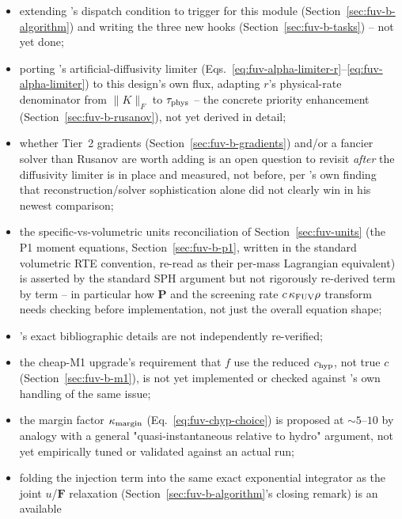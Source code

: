 \begin{itemize}
  \item extending 's dispatch condition to
    trigger for this module (Section~\ref{sec:fuv-b-algorithm}) and
    writing the three new  hooks
    (Section~\ref{sec:fuv-b-tasks}) -- not yet done;
  \item porting \citet{Hopkins2017diffusion}'s artificial-diffusivity
    limiter (Eqs.~\ref{eq:fuv-alpha-limiter-r}--\ref{eq:fuv-alpha-limiter})
    to this design's own flux, adapting $r$'s physical-rate denominator
    from $\|K\|_F$ to $\tau_{\rm phys}$ -- the concrete priority
    enhancement (Section~\ref{sec:fuv-b-rusanov}), not yet derived in
    detail;
  \item whether Tier~2 gradients (Section~\ref{sec:fuv-b-gradients})
    and/or a fancier solver than Rusanov are worth adding is an open
    question to revisit \emph{after} the diffusivity limiter is in
    place and measured, not before, per \citet{Rosswog2026}'s own
    finding that reconstruction/solver sophistication alone did not
    clearly win in his newest comparison;
  \item the specific-vs-volumetric units reconciliation of
    Section~\ref{sec:fuv-units} (the P1 moment equations,
    Section~\ref{sec:fuv-b-p1}, written in the standard volumetric RTE
    convention, re-read as their per-mass Lagrangian equivalent) is
    asserted by the standard SPH argument but not rigorously re-derived
    term by term -- in particular how $\mathbf P$ and the screening
    rate $c\,\kappa_{\rm FUV}\rho$ transform needs checking before
    implementation, not just the overall equation shape;
  \item \citet{Rusanov1961}'s exact bibliographic details are not
    independently re-verified;
  \item the cheap-M1 upgrade's requirement that $f$ use the reduced
    $c_{\rm hyp}$, not true $c$ (Section~\ref{sec:fuv-b-m1}), is not yet
    implemented or checked against 's own handling of the
    same issue;
  \item the margin factor $\kappa_{\rm margin}$
    (Eq.~\ref{eq:fuv-chyp-choice}) is proposed at $\sim5$--$10$ by
    analogy with a general "quasi-instantaneous relative to hydro"
    argument, not yet empirically tuned or validated against an actual
    run;
  \item folding the injection term into the same exact exponential
    integrator as the joint $u$/$\mathbf F$ relaxation
    (Section~\ref{sec:fuv-b-algorithm}'s closing remark) is an available

\end{itemize}
